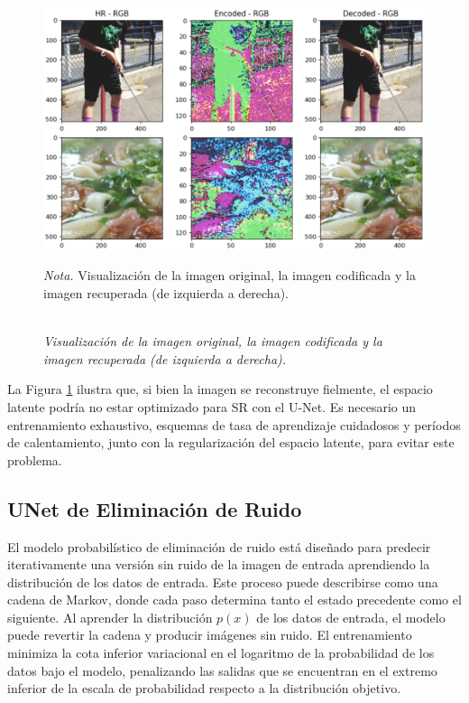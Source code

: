 \begin{figure}[H]
    \caption{\doublespacing \\ \textit{Visualización de la imagen original, la imagen codificada y la imagen recuperada (de izquierda a derecha).}} 
    \centering
    \includegraphics[width=1\linewidth]{images/autoencoder.png}
    \begin{justify}
        \textit{Nota.} Visualización de la imagen original, la imagen codificada y la imagen recuperada (de izquierda a derecha).
    \end{justify}                    
    \label{fig:autoencoder}
\end{figure}

La Figura \ref{fig:autoencoder} ilustra que, si bien la imagen se reconstruye fielmente, el espacio latente podría no estar optimizado para SR con el U-Net. Es necesario un entrenamiento exhaustivo, esquemas de tasa de aprendizaje cuidadosos y períodos de calentamiento, junto con la regularización del espacio latente, para evitar este problema.

\subsection{UNet de Eliminación de Ruido}
El modelo probabilístico de eliminación de ruido está diseñado para predecir iterativamente una versión sin ruido de la imagen de entrada aprendiendo la distribución de los datos de entrada. Este proceso puede describirse como una cadena de Markov, donde cada paso determina tanto el estado precedente como el siguiente. Al aprender la distribución $p(x)$ de los datos de entrada, el modelo puede revertir la cadena y producir imágenes sin ruido. El entrenamiento minimiza la cota inferior variacional en el logaritmo de la probabilidad de los datos bajo el modelo, penalizando las salidas que se encuentran en el extremo inferior de la escala de probabilidad respecto a la distribución objetivo.


